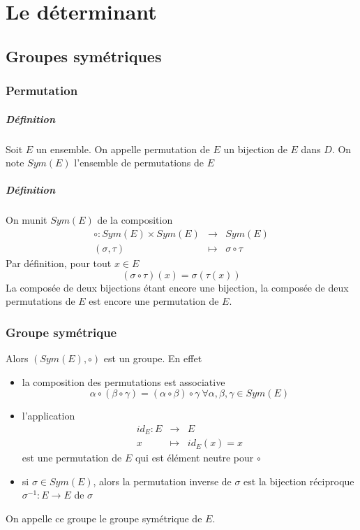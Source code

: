 \chapter{Le déterminant}

%
%
\section{Groupes symétriques}
%
%
%
\subsection{Permutation}
%
\paragraph{Définition} Soit $E$ un ensemble. On appelle permutation de $E$ un bijection  de $E$ dans $D$. On note $Sym(E)$ l'ensemble de permutations de $E$

\paragraph{Définition} On munit $Sym(E)$ de la composition
\begin{eqnarray*}
  \circ: Sym(E) \times Sym(E) &\rightarrow& Sym(E) \\
  (\sigma , \tau) &\mapsto& \sigma \circ \tau
\end{eqnarray*}
Par définition, pour tout $x\in E$
$$(\sigma \circ \tau)(x) = \sigma(\tau(x))$$
La composée de deux bijections étant encore une bijection, la composée de deux permutations de $E$ est encore une permutation de $E$.

%
\subsection{Groupe symétrique}
%
Alors $(Sym(E), \circ)$ est un groupe. En effet
\begin{itemize}
  \item la composition des permutations est associative
    $$\alpha \circ (\beta \circ \gamma) = (\alpha \circ \beta) \circ \gamma ~ \forall \alpha, \beta, \gamma \in Sym(E)$$
  
  \item l'application
    \begin{eqnarray*}
      id_E: E &\rightarrow& E \\
      x &\mapsto& id_E(x) = x 
    \end{eqnarray*}
    est une permutation de $E$ qui est élément neutre pour $\circ$
    
  \item si $\sigma \in Sym(E)$, alors la permutation inverse de $\sigma$ est la bijection réciproque $\sigma^{-1}: E \rightarrow E$ de $\sigma$
\end{itemize}
On appelle ce groupe le groupe symétrique de $E$.

